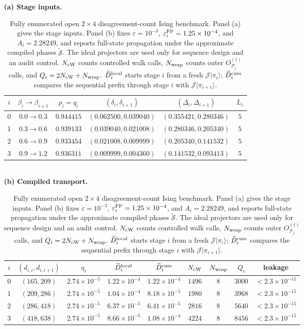 \begin{table}[!t]
\caption{Fully enumerated open $2\times4$ disagreement-count Ising benchmark. Panel (a) gives the stage inputs. Panel (b) fixes $\varepsilon=10^{-3}$, $\varepsilon_i^{\rm FP}=1.25\times10^{-4}$, and $A_i=2.28249$, and reports full-state propagation under the approximate compiled phases $\widetilde{\mathcal S}$. The ideal projectors are used only for sequence design and an audit control. $N_{\rm cW}$ counts controlled walk calls, $N_{\rm wrap}$ counts outer $O_{\mathcal P_j}^{(\dagger)}$ calls, and $Q_i=2N_{\rm cW}+N_{\rm wrap}$. $\widetilde D_i^{\rm local}$ starts stage $i$ from a fresh $\mathcal J\lvert\pi_i\rangle$; $\widetilde D_i^{\rm cum}$ compares the sequential prefix through stage $i$ with $\mathcal J\lvert\pi_{i+1}\rangle$.}
\label{tab:exact-benchmark}
\centering
\footnotesize
\textbf{(a) Stage inputs.}\quad
\setlength{\tabcolsep}{4.3pt}
\begin{tabular}{@{}cccccc@{}}
\toprule
$i$ & $\beta_i\!\to\!\beta_{i+1}$ & $p_i=q_i$ & $(\delta_i,\delta_{i+1})$ & $(\Delta_i,\Delta_{i+1})$ & $L_i$\\
\midrule
0 & $0.0\!\to\!0.3$ & $0.944415$ & $(0.062500,0.039040)$ & $(0.355421,0.280346)$ & $5$\\
1 & $0.3\!\to\!0.6$ & $0.939133$ & $(0.039040,0.021008)$ & $(0.280346,0.205340)$ & $5$\\
2 & $0.6\!\to\!0.9$ & $0.933454$ & $(0.021008,0.009999)$ & $(0.205340,0.141532)$ & $5$\\
3 & $0.9\!\to\!1.2$ & $0.936311$ & $(0.009999,0.004360)$ & $(0.141532,0.093413)$ & $5$\\
\bottomrule
\end{tabular}
\\[2pt]
\textbf{(b) Compiled transport.}\quad
\setlength{\tabcolsep}{3.4pt}
\begin{tabular}{@{}ccccccccc@{}}
\toprule
$i$ & $(d_{i,i},d_{i,i+1})$ & $\eta_i$ & $\widetilde D_i^{\rm local}$ & $\widetilde D_i^{\rm cum}$ & $N_{\rm cW}$ & $N_{\rm wrap}$ & $Q_i$ & leakage\\
\midrule
0 & $(165,209)$ & $2.74\!\times\!10^{-5}$ & $1.22\!\times\!10^{-4}$ & $1.22\!\times\!10^{-4}$ & $1496$ & $8$ & $3000$ & $<2.3\!\times\!10^{-15}$\\
1 & $(209,286)$ & $2.74\!\times\!10^{-5}$ & $1.04\!\times\!10^{-4}$ & $8.18\!\times\!10^{-5}$ & $1980$ & $8$ & $3968$ & $<2.3\!\times\!10^{-15}$\\
2 & $(286,418)$ & $2.74\!\times\!10^{-5}$ & $6.37\!\times\!10^{-5}$ & $6.41\!\times\!10^{-5}$ & $2816$ & $8$ & $5640$ & $<2.3\!\times\!10^{-15}$\\
3 & $(418,638)$ & $2.74\!\times\!10^{-5}$ & $8.66\!\times\!10^{-5}$ & $1.08\!\times\!10^{-4}$ & $4224$ & $8$ & $8456$ & $<2.3\!\times\!10^{-15}$\\
\bottomrule
\end{tabular}
\end{table}

